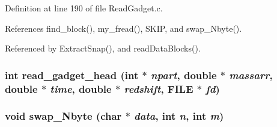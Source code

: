 Definition at line 190 of file ReadGadget.c.



References find\_\-block(), my\_\-fread(), SKIP, and swap\_\-Nbyte().



Referenced by ExtractSnap(), and readDataBlocks().

\subsubsection[{read\_\-gadget\_\-head}]{\setlength{\rightskip}{0pt plus 5cm}int read\_\-gadget\_\-head (int $\ast$ {\em npart}, \/  double $\ast$ {\em massarr}, \/  double $\ast$ {\em time}, \/  double $\ast$ {\em redshift}, \/  FILE $\ast$ {\em fd})}\label{ReadGadget_8h_acbadd26f5dfcab3e523db042f0b01209}
\subsubsection[{swap\_\-Nbyte}]{\setlength{\rightskip}{0pt plus 5cm}void swap\_\-Nbyte (char $\ast$ {\em data}, \/  int {\em n}, \/  int {\em m})}\label{ReadGadget_8h_a5521647d705d1b38d62f6c497d6ce8dc}
